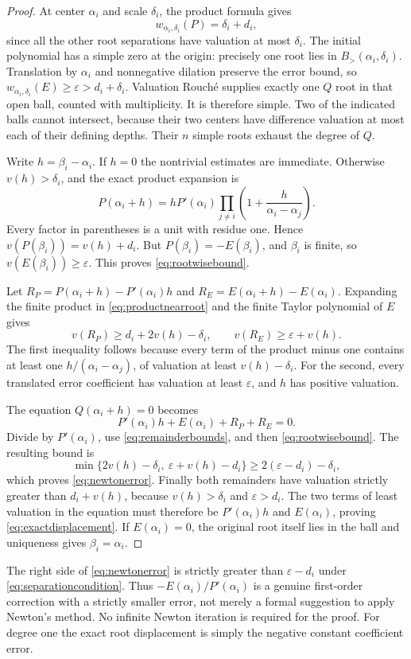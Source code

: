 \documentclass[11pt,letterpaper]{article}
\numberwithin{equation}{section}
\theoremstyle{definition}
\theoremstyle{remark}\newtheorem{remark}[theorem]{Remark}
\newcommand{\Bgt}[2]{B_{>}(#1,#2)}
\begin{document}
\begin{proof}
At center $\alpha_i$ and scale $\delta_i$, the product formula gives
\[
 w_{\alpha_i,\delta_i}(P)=\delta_i+d_i,
\]
since all the other root separations have valuation at most $\delta_i$.
The initial polynomial has a simple zero at the origin: precisely one
root lies in $\Bgt{\alpha_i}{\delta_i}$. Translation by $\alpha_i$
and nonnegative dilation preserve the error bound, so
$w_{\alpha_i,\delta_i}(E)\ge\varepsilon>d_i+\delta_i$.
Valuation Rouch\'e supplies exactly one $Q$ root in that open ball,
counted with multiplicity. It is therefore simple. Two of the indicated
balls cannot intersect, because their two centers have difference
valuation at most each of their defining depths. Their $n$ simple
roots exhaust the degree of $Q$.

Write $h=\beta_i-\alpha_i$. If $h=0$ the nontrivial estimates are
immediate. Otherwise $v(h)>\delta_i$, and the exact product expansion is
\begin{equation}\label{eq:productnearroot}
 P(\alpha_i+h)=hP'(\alpha_i)
       \prod_{j\ne i}\left(1+\frac{h}{\alpha_i-\alpha_j}\right).
\end{equation}
Every factor in parentheses is a unit with residue one. Hence
$v(P(\beta_i))=v(h)+d_i$. But
$P(\beta_i)=-E(\beta_i)$, and $\beta_i$ is finite, so
$v(E(\beta_i))\ge\varepsilon$. This proves \eqref{eq:rootwisebound}.

Let $R_P=P(\alpha_i+h)-P'(\alpha_i)h$ and
$R_E=E(\alpha_i+h)-E(\alpha_i)$. Expanding the finite product in
\eqref{eq:productnearroot} and the finite Taylor polynomial of $E$
gives
\begin{equation}\label{eq:remainderbounds}
 v(R_P)\ge d_i+2v(h)-\delta_i,\qquad
 v(R_E)\ge\varepsilon+v(h).
\end{equation}
The first inequality follows because every term of the product minus
one contains at least one $h/(\alpha_i-\alpha_j)$, of valuation at
least $v(h)-\delta_i$. For the second, every translated error
coefficient has valuation at least $\varepsilon$, and $h$ has positive
valuation.

The equation $Q(\alpha_i+h)=0$ becomes
\[
 P'(\alpha_i)h+E(\alpha_i)+R_P+R_E=0.
\]
Divide by $P'(\alpha_i)$, use \eqref{eq:remainderbounds}, and then
\eqref{eq:rootwisebound}. The resulting bound is
\[
 \min\{2v(h)-\delta_i,\ \varepsilon+v(h)-d_i\}
 \ge2(\varepsilon-d_i)-\delta_i,
\]
which proves \eqref{eq:newtonerror}.
Finally both remainders have valuation strictly greater than
$d_i+v(h)$, because $v(h)>\delta_i$ and $\varepsilon>d_i$.
The two terms of least valuation in the equation must therefore be
$P'(\alpha_i)h$ and $E(\alpha_i)$, proving
\eqref{eq:exactdisplacement}. If $E(\alpha_i)=0$, the original root
itself lies in the ball and uniqueness gives $\beta_i=\alpha_i$.
\end{proof}
The right side of \eqref{eq:newtonerror} is strictly greater than
$\varepsilon-d_i$ under \eqref{eq:separationcondition}. Thus
$-E(\alpha_i)/P'(\alpha_i)$ is a genuine first-order correction with
a strictly smaller error, not merely a formal suggestion to apply
Newton's method. No infinite Newton iteration is required for the proof.
For degree one the exact root displacement is simply the negative
constant coefficient error.
\end{document}
